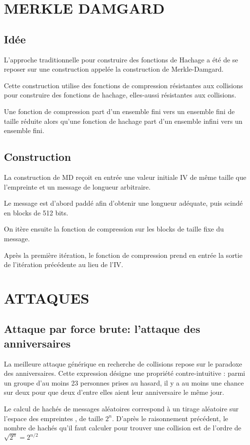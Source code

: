 \documentclass[10.5pt, a4paper, twoside, openright]{report}
\begin{document}
\chapter{MERKLE DAMGARD}
\section{Idée}
L’approche traditionnelle pour construire des fonctions de Hachage a été de se reposer sur une construction appelée la construction de Merkle-Damgard.

Cette construction utilise des fonctions de compression résistantes aux collisions pour construire des fonctions de hachage, elles-aussi résistantes aux collisions.

Une fonction de compression part d’un ensemble fini vers un ensemble fini de taille réduite alors qu'une fonction de hachage part d’un ensemble infini vers un ensemble fini. 

\section{Construction}

La construction de MD reçoit en entrée une valeur initiale IV de même taille que l'empreinte et un message de longueur arbitraire.

Le message est d'abord paddé afin d'obtenir une longueur adéquate, puis scindé en blocks de 512 bits.

On itère ensuite la fonction de compression sur les blocks de taille fixe du message.

Après la première itération, le fonction de compression prend en entrée la sortie de l'itération précédente au lieu de l'IV.


\chapter{ATTAQUES}
\section{Attaque par force brute: l’attaque des anniversaires}
La meilleure attaque générique en recherche de collisions repose sur le paradoxe des anniversaires. Cette expression désigne une propriété contre-intuitive : parmi un groupe d’au moins 23 personnes prises au hasard, il y a au moins une chance sur deux pour que deux d’entre elles aient leur anniversaire le même jour. 

Le calcul de hachés de messages aléatoires correspond à un tirage aléatoire sur l’espace des empreintes , de taille $2^n$. D’après le raisonnement précédent, le nombre de hachés qu’il faut calculer pour trouver une collision est de l’ordre de $\sqrt{2^n} = 2^{n/2}$
\end{document}
